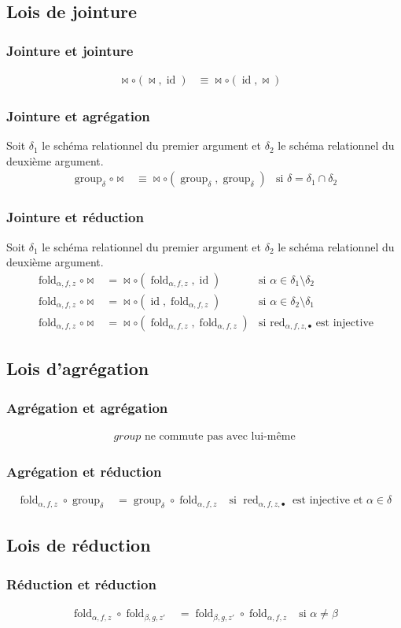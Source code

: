 \documentclass[french]{article}
\DeclareMathOperator{\group}{group}
\DeclareMathOperator{\id}{id}
\DeclareMathOperator{\redu}{red}
\newcommand{\groupDelta}{\group_{\delta}}
\newcommand{\fold}[3]{\operatorname{fold}_{#1, #2, #3}}
\newcommand{\foldAlphafz}{\fold{\alpha}{f}{z}}
\newcommand{\args}{Soit $\delta_1$ le schéma relationnel du premier
	argument et $\delta_2$ le schéma relationnel du deuxième
	argument.}
\begin{document}
\subsection*{Lois de jointure}
\subsubsection*{Jointure et jointure}
\begin{align}
\Join \circ (\Join, \id)
& \equiv \Join \circ (\id, \Join) &
\end{align}

\subsubsection*{Jointure et agrégation}
\args
\begin{align}
\groupDelta \circ \Join
& \equiv \Join \circ (\groupDelta, \groupDelta)
& \text{si $\delta = \delta_1 \cap \delta_2$}
\end{align}

\subsubsection*{Jointure et réduction}
\args
\begin{align}
\foldAlphafz \circ \Join
& = \Join \circ (\foldAlphafz, \id)
& \text{si $\alpha \in \delta_1 \setminus \delta_2$} \\
\foldAlphafz \circ \Join
& = \Join \circ (\id, \foldAlphafz)
& \text{si $\alpha \in \delta_2 \setminus \delta_1$} \\
\foldAlphafz \circ \Join
& = \Join \circ (\foldAlphafz, \foldAlphafz)
& \text{si $\redu_{\alpha, f, z, \bullet}$ est injective}
\end{align}

\subsection*{Lois d'agrégation}
\subsubsection*{Agrégation et agrégation}
\begin{align}
\text{$group$ ne commute pas avec lui-même}
\end{align}

\subsubsection*{Agrégation et réduction}
\begin{align}
\foldAlphafz \circ \groupDelta
& = \groupDelta \circ \foldAlphafz
& \text{si $\redu_{\alpha, f, z, \bullet}$ est injective et $\alpha \in \delta$}
\end{align}

\subsection*{Lois de réduction}
\subsubsection*{Réduction et réduction}
\begin{align}
\foldAlphafz \circ \fold{\beta}{g}{z'}
& = \fold{\beta}{g}{z'} \circ \foldAlphafz
& \text{si $\alpha \neq \beta$}
\end{align}
\end{document}
